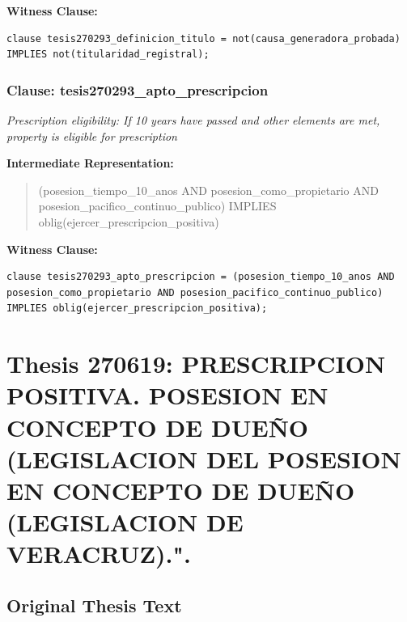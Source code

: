 \documentclass[11pt,a4paper]{article}
\begin{document}
\textbf{Witness Clause:}

\begin{lstlisting}[style=witnessstyle, language=Witness]
clause tesis270293_definicion_titulo = not(causa_generadora_probada) IMPLIES not(titularidad_registral);
\end{lstlisting}

\subsubsection{Clause: tesis270293\_apto\_prescripcion}

\textit{Prescription eligibility: If 10 years have passed and other elements are met, property is eligible for prescription}

\textbf{Intermediate Representation:}

\begin{quote}
(posesion\_tiempo\_10\_anos AND posesion\_como\_propietario AND posesion\_pacifico\_continuo\_publico) IMPLIES oblig(ejercer\_prescripcion\_positiva)
\end{quote}

\textbf{Witness Clause:}

\begin{lstlisting}[style=witnessstyle, language=Witness]
clause tesis270293_apto_prescripcion = (posesion_tiempo_10_anos AND posesion_como_propietario AND posesion_pacifico_continuo_publico) IMPLIES oblig(ejercer_prescripcion_positiva);
\end{lstlisting}

\newpage

\section{Thesis 270619: PRESCRIPCION POSITIVA. POSESION EN CONCEPTO DE DUEÑO (LEGISLACION DEL POSESION EN CONCEPTO DE DUEÑO (LEGISLACION DE VERACRUZ).".}
\label{thesis:270619}

\subsection{Original Thesis Text}
\end{document}
